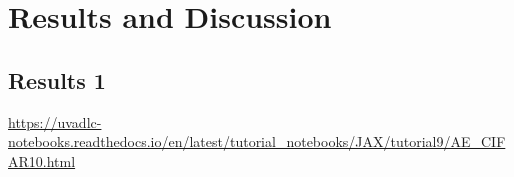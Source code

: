 \newpage
\section{Results and Discussion}\label{sec:Results}


\subsection{Results 1}\label{sec:project results}



\url{https://uvadlc-notebooks.readthedocs.io/en/latest/tutorial_notebooks/JAX/tutorial9/AE_CIFAR10.html}





